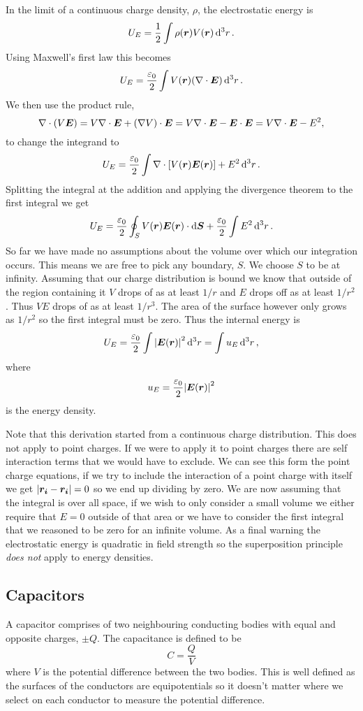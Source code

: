     In the limit of a continuous charge density, \(\rho\), the electrostatic energy is
    \[U_E = \frac{1}{2}\int\rho(\bm{r})V(\bm{r})\dd[3]{r}.\]
    Using Maxwell's first law this becomes
    \[U_E = \frac{\varepsilon_0}{2}\int V(\bm{r})(\nabla\cdot\bm{E})\dd[3]{r}.\]
    We then use the product rule,
    \[\nabla\cdot(V\bm{E}) = V\nabla\cdot\bm{E} + (\nabla V)\cdot\bm{E} = V\nabla\cdot\bm{E} - \bm{E}\cdot\bm{E} = V\nabla\cdot\bm{E} - E^2,\]
    to change the integrand to
    \[U_E = \frac{\varepsilon_0}{2}\int \nabla\cdot[V(\bm{r})\bm{E}(\bm{r})] + E^2\dd[3]{r}.\]
    Splitting the integral at the addition and applying the divergence theorem to the first integral we get
    \[U_E = \frac{\varepsilon_0}{2}\oint_SV(\bm{r})\bm{E}(\bm{r})\cdot\dd{\bm{S}} + \frac{\varepsilon_0}{2}\int E^2\dd[3]{r}.\]
    So far we have made no assumptions about the volume over which our integration occurs.
    This means we are free to pick any boundary, \(S\).
    We choose \(S\) to be at infinity.
    Assuming that our charge distribution is bound we know that outside of the region containing it \(V\) drops of as at least \(1/r\) and \(E\) drops off as at least \(1/r^2\).
    Thus \(VE\) drops of as at least \(1/r^3\).
    The area of the surface however only grows as \(1/r^2\) so the first integral must be zero.
    Thus the internal energy is
    \[U_E = \frac{\varepsilon_0}{2}\int \abs{\bm{E}(\bm{r})}^2\dd[3]{r} = \int u_E \dd[3]{r},\]
    where
    \[u_E = \frac{\varepsilon_0}{2}\abs{\bm{E}(\bm{r})}^2\]
    is the energy density.
    
    Note that this derivation started from a continuous charge distribution.
    This does not apply to point charges.
    If we were to apply it to point charges there are self interaction terms that we would have to exclude.
    We can see this form the point charge equations, if we try to include the interaction of a point charge with itself we get \(\abs{\bm{r_i} - \bm{r_i}} = 0\) so we end up dividing by zero.
    We are now assuming that the integral is over all space, if we wish to only consider a small volume we either require that \(E = 0\) outside of that area or we have to consider the first integral that we reasoned to be zero for an infinite volume.
    As a final warning the electrostatic energy is quadratic in field strength so the superposition principle \emph{does not} apply to energy densities.
    
    \subsection{Capacitors}
    A capacitor comprises of two neighbouring conducting bodies with equal and opposite charges, \(\pm Q\).
    The capacitance is defined to be
    \[C = \frac{Q}{V}\]
    where \(V\) is the potential difference between the two bodies.
    This is well defined as the surfaces of the conductors are equipotentials so it doesn't matter where we select on each conductor to measure the potential difference.
    

